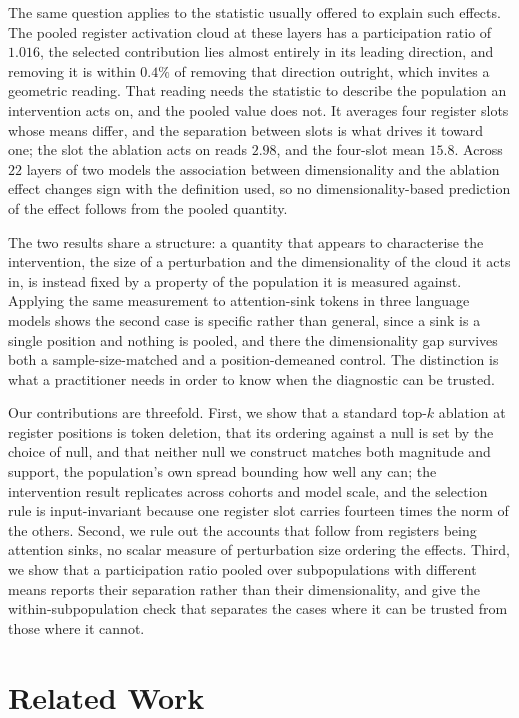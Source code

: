 \documentclass{article}
\begin{document}
The same question applies to the statistic usually offered to explain such effects. The pooled register activation cloud at these layers has a participation ratio of $1.016$, the selected contribution lies almost entirely in its leading direction, and removing it is within $0.4\%$ of removing that direction outright, which invites a geometric reading. That reading needs the statistic to describe the population an intervention acts on, and the pooled value does not. It averages four register slots whose means differ, and the separation between slots is what drives it toward one; the slot the ablation acts on reads $2.98$, and the four-slot mean $15.8$. Across $22$ layers of two models the association between dimensionality and the ablation effect changes sign with the definition used, so no dimensionality-based prediction of the effect follows from the pooled quantity.

The two results share a structure: a quantity that appears to characterise the intervention, the size of a perturbation and the dimensionality of the cloud it acts in, is instead fixed by a property of the population it is measured against. Applying the same measurement to attention-sink tokens in three language models shows the second case is specific rather than general, since a sink is a single position and nothing is pooled, and there the dimensionality gap survives both a sample-size-matched and a position-demeaned control. The distinction is what a practitioner needs in order to know when the diagnostic can be trusted.

Our contributions are threefold. First, we show that a standard top-$k$ ablation at register positions is token deletion, that its ordering against a null is set by the choice of null, and that neither null we construct matches both magnitude and support, the population's own spread bounding how well any can; the intervention result replicates across cohorts and model scale, and the selection rule is input-invariant because one register slot carries fourteen times the norm of the others. Second, we rule out the accounts that follow from registers being attention sinks, no scalar measure of perturbation size ordering the effects. Third, we show that a participation ratio pooled over subpopulations with different means reports their separation rather than their dimensionality, and give the within-subpopulation check that separates the cases where it can be trusted from those where it cannot.

\section{Related Work}
\end{document}
